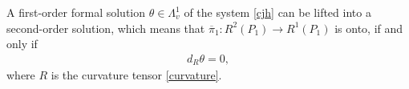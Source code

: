 \begin{Theorem} \label{thm:obstr1} A first-order formal solution $\theta \in \Lambda^1_v$ of
the system \eqref{cjh} can be lifted into a second-order solution,
which means that $\overline{\pi}_{1}: R^{2}(P_1) \to R^{1}(P_1)$
is onto, if and only if
\begin{gather} d_R\theta=0, \label{drtheta} \end{gather}
where $R$ is the curvature tensor \eqref{curvature}.
\end{Theorem}
